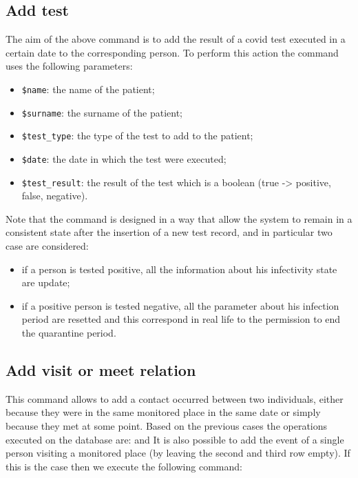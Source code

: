 \documentclass{article}
\newenvironment{code}{\captionsetup{type=listing}}{}
\begin{document}
		\subsection{Add test}
		\begin{code}
		\end{code}
		The aim of the above command is to add the result of a covid test executed in a certain date to the corresponding person. To perform this action the command uses the following parameters:
		\begin{itemize}
			\item \texttt{\$name}: the name of the patient;
			\item \texttt{\$surname}: the surname of the patient;
			\item \texttt{\$test\_type}: the type of the test to add to the patient;
			\item \texttt{\$date}: the date in which the test were executed;
			\item \texttt{\$test\_result}: the result of the test which is a boolean (true -> positive, false, negative).
		\end{itemize}
		Note that the command is designed in a way that allow the system to remain in a consistent state after the insertion of a new test record, and in particular two case are considered:
		\begin{itemize}
			\item if a person is tested positive, all the information about his infectivity state are update;
			\item if a positive person is tested negative, all the parameter about his infection period are resetted and this correspond in real life to the permission to end the quarantine period.  
		\end{itemize}
		\subsection{Add visit or meet relation}
		This command allows to add a contact occurred between two individuals, either because they were in the same monitored place in the same date or simply because they met at some point. Based on the previous cases the operations executed on the database are:
		\begin{code}\end{code}
		and 
		\begin{code}\end{code}
		It is also possible to add the event of a single person visiting a monitored place (by leaving the second and third row empty). If this is the case then we execute the following command:
		\begin{code}\end{code}
\end{document}
